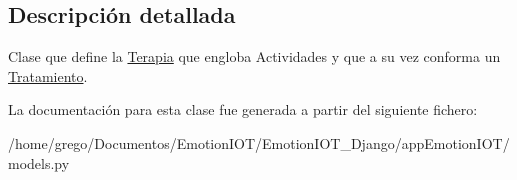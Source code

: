 \subsection{Descripción detallada}
Clase que define la \hyperlink{classappEmotionIOT_1_1models_1_1Terapia}{Terapia} que engloba Actividades y que a su vez conforma un \hyperlink{classappEmotionIOT_1_1models_1_1Tratamiento}{Tratamiento}. 

La documentación para esta clase fue generada a partir del siguiente fichero\+:\begin{DoxyCompactItemize}
\item 
/home/grego/\+Documentos/\+Emotion\+I\+O\+T/\+Emotion\+I\+O\+T\+\_\+\+Django/app\+Emotion\+I\+O\+T/models.\+py\end{DoxyCompactItemize}

